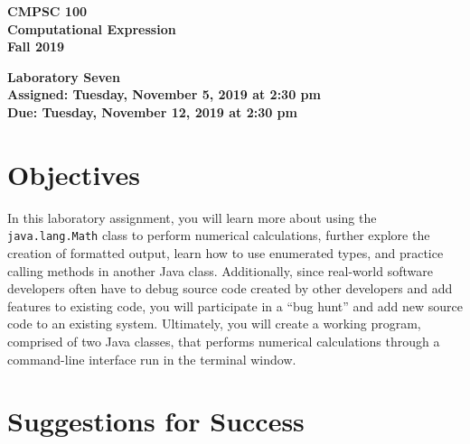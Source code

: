 \documentclass[11pt]{article}
\newcommand{\assignmentduedate}{November 12}
\newcommand{\assignmentassignedate}{November 5}
\newcommand{\assignmentnumber}{Seven}
\newcommand{\labyear}{2019}
\newcommand{\labday}{Tuesday}
\newcommand{\labtime}{2:30 pm}
\newcommand{\assigneddate}{Assigned: \labday, \assignmentassignedate, \labyear{} at \labtime{}}
\newcommand{\duedate}{Due: \labday, \assignmentduedate, \labyear{} at \labtime{}}
\newcommand{\labtitle}[1]
{
  \begin{center}
    \begin{center}
      \bf
      CMPSC 100\\Computational Expression\\
      Fall 2019\\
      \medskip
    \end{center}
    \bf
    #1
  \end{center}
}
\begin{document}
\thispagestyle{empty}

\labtitle{Laboratory \assignmentnumber{} \\ \assigneddate{} \\ \duedate{}}

\section*{Objectives}

In this laboratory assignment, you will learn more about using the {\tt
java.lang.Math} class to perform numerical calculations, further explore the
creation of formatted output, learn how to use enumerated types, and practice
calling methods in another Java class. Additionally, since real-world software
developers often have to debug source code created by other developers and add
features to existing code, you will participate in a ``bug hunt'' and add new
source code to an existing system. Ultimately, you will create a working
program, comprised of two Java classes, that performs numerical calculations
through a command-line interface run in the terminal window.

\section*{Suggestions for Success}
\end{document}

